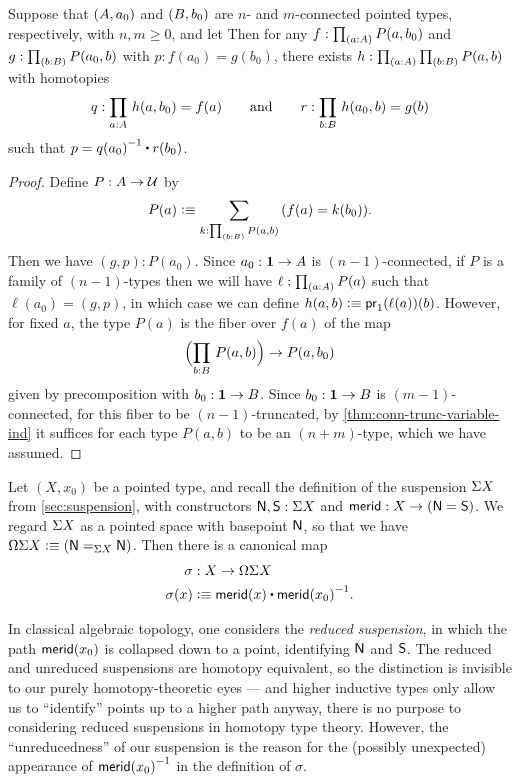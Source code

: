 \begin{lem}\label{thm:wedge-connectivity}
  Suppose that $\pairr{A,a_0}$ and $\pairr{B,b_0}$ are $n$- and $m$-connected pointed types, respectively, with $n,m\geq0$, and let
%
%
Then for any ${f:\prd{a:A} P(a,b_0)}$ and ${g:\prd{b:B} P(a_0,b)}$ with $p:f(a_0) = g(b_0)$, there exists $h:\prd{a:A}{b:B} P(a,b)$ with homotopies
%
\begin{equation*}
  q:\prd{a:A} h(a,b_0)=f(a)
  \qquad\text{and}\qquad
  r:\prd{b:B} h(a_0,b)=g(b)
 \end{equation*}
%
such that $p = \opp{q(a_0)} \ct r(b_0)$.
\end{lem}
\begin{proof}
  Define $P:A\to\type$ by
  \[ P(a) \defeq \sm{k:\prd{b:B} P(a,b)} (f(a) = k(b_0)). \]
  Then we have $(g,p):P(a_0)$.
  Since $a_0:\unit\to A$ is $(n-1)$-connected, if $P$ is a family of $(n-1)$-types then we will have $\ell:\prd{a:A} P(a)$ such that $\ell(a_0) = (g,p)$, in which case we can define $h(a,b) \defeq \proj1(\ell(a))(b)$.
  However, for fixed $a$, the type $P(a)$ is the fiber over $f(a)$ of the map
  \[ \Parens{\prd{b:B} P(a,b) } \to P(a,b_0) \]
  given by precomposition with $b_0:\unit\to B$.
  Since $b_0:\unit\to B$ is $(m-1)$-connected, for this fiber to be $(n-1)$-truncated, by \cref{thm:conn-trunc-variable-ind} it suffices for each type $P(a,b)$ to be an $(n+m)$-type, which we have assumed.
\end{proof}

Let $(X,x_0)$ be a pointed type, and recall the definition of the suspension $\susp X$ from \cref{sec:suspension}, with constructors $\north,\south:\susp X$ and $\merid:X \to (\north=\south)$.
We regard $\susp X$ as a pointed space with basepoint $\north$, so that we have $\Omega\susp X \defeq (\id[\susp X]\north\north)$.
Then there is a canonical map
\begin{align*}
  \sigma &: X \to \Omega\susp X\\
  \sigma(x) &\defeq \merid(x) \ct \opp{\merid(x_0)}.
\end{align*}

\begin{rmk}
  In classical algebraic topology, one considers the \emph{reduced suspension}, in which the path $\merid(x_0)$ is collapsed down to a point, identifying $\north$ and $\south$.
  The reduced and unreduced suspensions are homotopy equivalent, so the distinction is invisible to our purely homotopy-theoretic eyes --- and higher inductive types only allow us to ``identify'' points up to a higher path anyway, there is no purpose to considering reduced suspensions in homotopy type theory.
  However, the ``unreducedness'' of our suspension is the reason for the (possibly unexpected) appearance of $\opp{\merid(x_0)}$ in the definition of $\sigma$.
\end{rmk}

